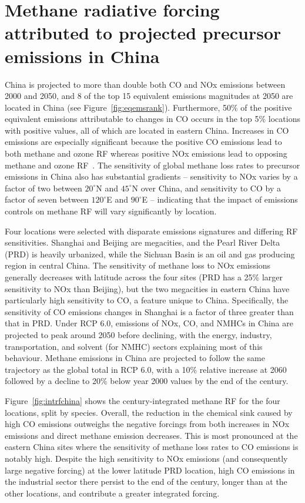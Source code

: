 \section{Methane radiative forcing attributed to projected precursor emissions in China}
\label{sec:china}
China is projected to more than double both CO and NOx emissions between 2000 and 2050, and 8 of the top 15 equivalent emissions magnitudes at 2050 are located in China (see Figure~\ref{fig:eqemsrank}). Furthermore, 50\% of the positive equivalent emissions attributable to changes in CO occurs in the top 5\% locations with positive values, all of which are located in eastern China. Increases in CO emissions are especially significant because the positive CO emissions lead to both methane and ozone RF whereas positive NOx emissions lead to opposing methane and ozone RF~\citep{ref:myhre2013}. The sensitivity of global methane loss rates to precursor emissions in China also has substantial gradients -- sensitivity to NOx varies by a factor of two between $20^{\circ}$N and $45^{\circ}$N over China, and sensitivity to CO by a factor of seven between $120^{\circ}$E and $90^{\circ}$E -- indicating that the impact of emissions controls on methane RF will vary significantly by location.

Four locations were selected with disparate emissions signatures and differing RF sensitivities. Shanghai and Beijing are megacities, and the Pearl River Delta (PRD) is heavily urbanized, while the Sichuan Basin is an oil and gas producing region in central China. The sensitivity of methane loss to NOx emissions generally decreases with latitude across the four sites (PRD has a 25\% larger sensitivity to NOx than Beijing), but the two megacities in eastern China have particularly high sensitivity to CO, a feature unique to China. Specifically, the sensitivity of CO emissions changes in Shanghai is a factor of three greater than that in PRD. Under RCP 6.0, emissions of NOx, CO, and NMHCs in China are projected to peak around 2050 before declining, with the energy, industry, transportation, and solvent (for NMHC) sectors explaining most of this behaviour. Methane emissions in China are projected to follow the same trajectory as the global total in RCP 6.0, with a 10\% relative increase at 2060 followed by a decline to 20\% below year 2000 values by the end of the century.

Figure~\ref{fig:intrfchina} shows the century-integrated methane RF for the four locations, split by species. Overall, the reduction in the chemical sink caused by high CO emissions outweighs the negative forcings from both increases in NOx emissions and direct methane emission decreases. This is most pronounced at the eastern China sites where the sensitivity of methane loss rates to CO emissions is notably high. Despite the high sensitivity to NOx emissions (and consequently large negative forcing) at the lower latitude PRD location, high CO emissions in the industrial sector there persist to the end of the century, longer than at the other locations, and contribute a greater integrated forcing.